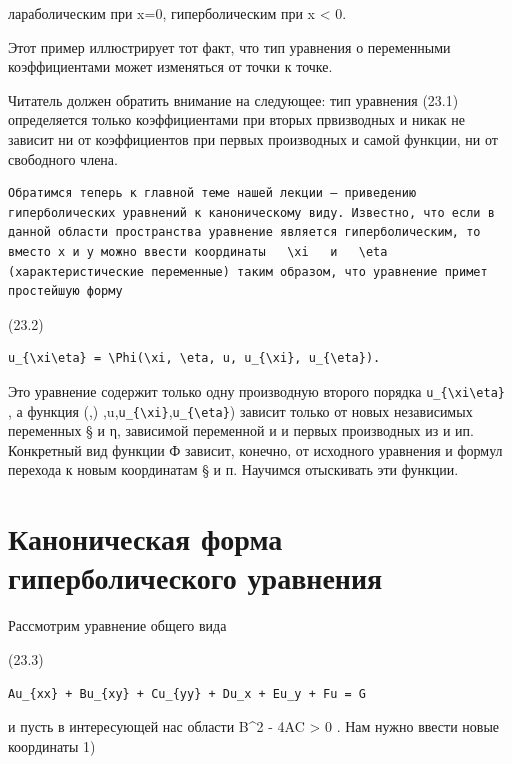 \documentclass[
  ukrainian,
]{article}
\begin{document}
лараболическим при x=0, гиперболическим при x \textless{} 0.

Этот пример иллюстрирует тот факт, что тип уравнения о переменными
коэффициентами может изменяться от точки к точке.

Читатель должен обратить внимание на следующее: тип уравнения (23.1)
определяется только коэффициентами при вторых првизводных и никак не
зависит ни от коэффициентов при первых производных и самой функции, ни
от свободного члена.

\begin{verbatim}
Обратимся теперь к главной теме нашей лекции — приведению гиперболических уравнений к каноническому виду. Известно, что если в данной области пространства уравнение является гиперболическим, то вместо x и y можно ввести координаты   \xi   и   \eta  (характеристические переменные) таким образом, что уравнение примет простейшую форму
\end{verbatim}

(23.2)

\begin{verbatim}
u_{\xi\eta} = \Phi(\xi, \eta, u, u_{\xi}, u_{\eta}).
\end{verbatim}

Это уравнение содержит только одну производную второго порядка
\texttt{u\_\{\textbackslash{}xi\textbackslash{}eta\}} , а функция
\Phi(\xi,)
\eta,u,\texttt{u\_\{\textbackslash{}xi\}},\texttt{u\_\{\textbackslash{}eta\}})
зависит только от новых независимых переменных § и η, зависимой
переменной и и первых производных из и ип. Конкретный вид функции Ф
зависит, конечно, от исходного уравнения и формул перехода к новым
координатам § и п. Научимся отыскивать эти функции.

\section{Каноническая форма гиперболического
уравнения}\label{ux43aux430ux43dux43eux43dux438ux447ux435ux441ux43aux430ux44f-ux444ux43eux440ux43cux430-ux433ux438ux43fux435ux440ux431ux43eux43bux438ux447ux435ux441ux43aux43eux433ux43e-ux443ux440ux430ux432ux43dux435ux43dux438ux44f}

Рассмотрим уравнение общего вида

(23.3)

\begin{verbatim}
Au_{xx} + Bu_{xy} + Cu_{yy} + Du_x + Eu_y + Fu = G
\end{verbatim}

и пусть в интересующей нас области B\^{}2 - 4AC \textgreater{} 0 . Нам
нужно ввести новые координаты 1)
\end{document}
